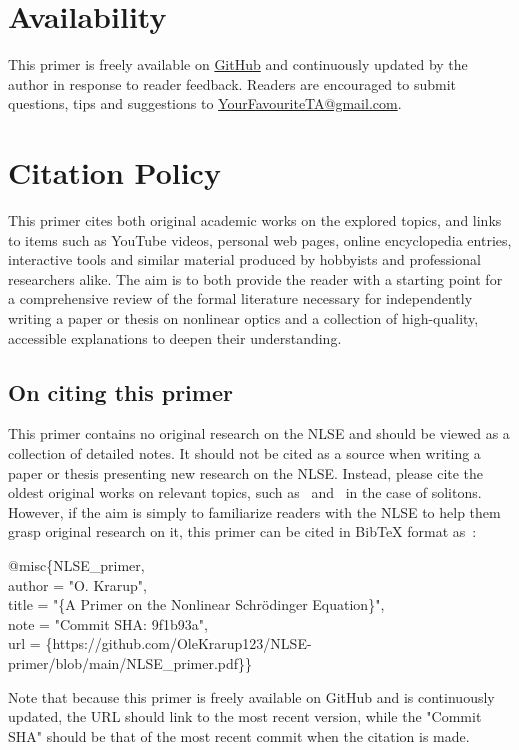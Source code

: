 \section{Availability}
This primer is freely available on \href{https://github.com/OleKrarup123/NLSE-primer}{GitHub} and continuously updated by the author in response to reader feedback. Readers are encouraged to submit questions, tips and suggestions to \href{yourfavouriteta@gmail.com}{YourFavouriteTA@gmail.com}. 


\section{Citation Policy}
This primer cites both original academic works on the explored topics, and links to items such as YouTube videos, personal web pages, online encyclopedia entries, interactive tools and similar material produced by hobbyists and professional researchers alike. The aim is to both provide the reader with a starting point for a comprehensive review of the formal literature necessary for independently writing a paper or thesis on nonlinear optics and a collection of high-quality, accessible explanations to deepen their understanding. 

\subsection{On citing this primer}
This primer contains no original research on the NLSE and should be viewed as a collection of detailed notes. It should not be cited as a source when writing a paper or thesis presenting new research on the NLSE. Instead, please cite the oldest original works on relevant topics, such as~\cite{soliton_first_theory} and~\cite{Soliton_experimental_first} in the case of solitons. However, if the aim is simply to familiarize readers with the NLSE to help them grasp original research on it, this primer can be cited in BibTeX format as~\cite{NLSE_primer}:\\
\begin{boxA}
@misc\{NLSE\_primer,  \\
author = "O. Krarup", \\
title = "\{A Primer on the Nonlinear Schrödinger Equation\}", \\
note = "Commit SHA: 9f1b93a", \\
url = \{https://github.com/OleKrarup123/NLSE-primer/blob/main/NLSE\_primer.pdf\}\}
\end{boxA}

Note that because this primer is freely available on GitHub and is continuously updated, the URL should link to the most recent version, while the "Commit SHA" should be that of the most recent commit when the citation is made.     